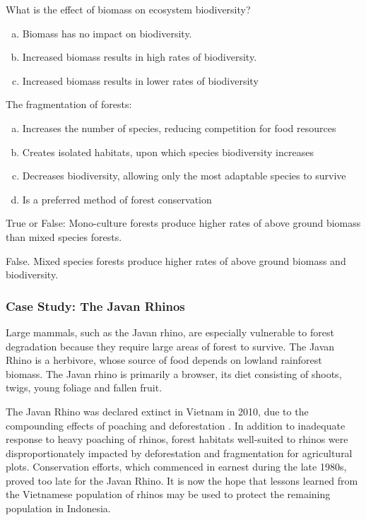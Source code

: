 \begin{problem}
What is the effect of biomass on ecosystem biodiversity?
\begin{enumerate}[(a)]
\item Biomass has no impact on biodiversity.
\item Increased biomass results in high rates of biodiversity.
\item Increased biomass results in lower rates of biodiversity 
\end{enumerate}
\end{problem}

\begin{problem}
The fragmentation of forests:
\begin{enumerate} [(a)]
\item Increases the number of species, reducing competition for food resources
\item Creates isolated habitats, upon which species biodiversity increases
\item Decreases biodiversity, allowing only the most adaptable species to survive
\item Is a preferred method of forest conservation
\end{enumerate}
\end{problem}

\begin{problem}
True or False: Mono-culture forests produce higher rates of above ground biomass than mixed species forests.

False. Mixed species forests produce higher rates of above ground biomass and biodiversity.
\end{problem}


\subsubsection{Case Study: The Javan Rhinos}

  Large mammals, such as the Javan rhino, are especially vulnerable to forest degradation because they require large areas of forest to survive. The Javan Rhino is a herbivore, whose source of food depends on lowland rainforest biomass. The Javan rhino is primarily a browser,  its diet consisting of shoots, twigs, young foliage and fallen fruit. 

 The Javan Rhino was declared extinct in Vietnam in 2010, due to the compounding effects of poaching and deforestation \citep{brook2014lessons}. In addition to inadequate response to heavy poaching of rhinos, forest habitats well-suited to rhinos were disproportionately impacted by deforestation and fragmentation for agricultural plots.  Conservation efforts, which commenced in earnest during the late 1980s, proved too late for the Javan Rhino.  It is now the hope that lessons learned from the Vietnamese population of rhinos may be used to protect the remaining population in Indonesia.
  
